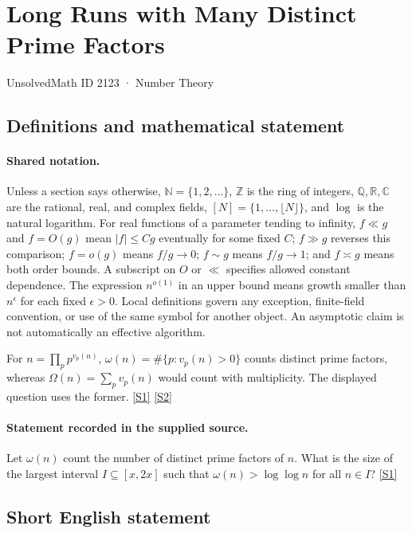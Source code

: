 \documentclass[11pt,a4paper]{article}
\newcommand{\N}{\mathbb{N}}
\newcommand{\Z}{\mathbb{Z}}
\newcommand{\Q}{\mathbb{Q}}
\newcommand{\R}{\mathbb{R}}
\newcommand{\C}{\mathbb{C}}
\newcommand{\sref}[2]{\hyperlink{source:#1:#2}{[S#2]}}
\begin{document}

\setcounter{section}{2122}

\section{Long Runs with Many Distinct Prime Factors}\label{2123}

{\small\sffamily UnsolvedMath ID 2123 · Number Theory}

\subsection{Definitions and mathematical statement}

\paragraph{Shared notation.}Unless a section says otherwise, $\N=\{1,2,\ldots\}$,
$\Z$ is the ring of integers, $\Q,\R,\C$ are the rational, real, and complex
fields, $[N]=\{1,\ldots,\lfloor N\rfloor\}$, and $\log$ is the natural
logarithm. For real functions of a parameter tending to infinity,
$f\ll g$ and $f=O(g)$ mean $|f|\leq Cg$ eventually for some fixed $C$;
$f\gg g$ reverses this comparison; $f=o(g)$ means $f/g\to0$;
$f\sim g$ means $f/g\to1$; and $f\asymp g$ means both order bounds.
A subscript on $O$ or $\ll$ specifies allowed constant dependence.
The expression $n^{o(1)}$ in an upper bound means growth smaller than
$n^\epsilon$ for each fixed $\epsilon>0$. Local definitions govern any
exception, finite-field convention, or use of the same symbol for another
object. An asymptotic claim is not automatically an effective algorithm.



For $n=\prod_pp^{v_p(n)}$, $\omega(n)=\#\{p:v_p(n)>0\}$ counts distinct prime factors, whereas $\Omega(n)=\sum_pv_p(n)$ would count with multiplicity. The displayed question uses the former. \sref{2123}{1} \sref{2123}{2}

\paragraph{Statement recorded in the supplied source.}
Let $\omega(n)$ count the number of distinct prime factors of $n$. What is the size of the largest interval $I\subseteq [x,2x]$ such that $\omega(n)>\log\log n$ for all $n\in I$? \sref{2123}{1}

\subsection{Short English statement}
\end{document}
